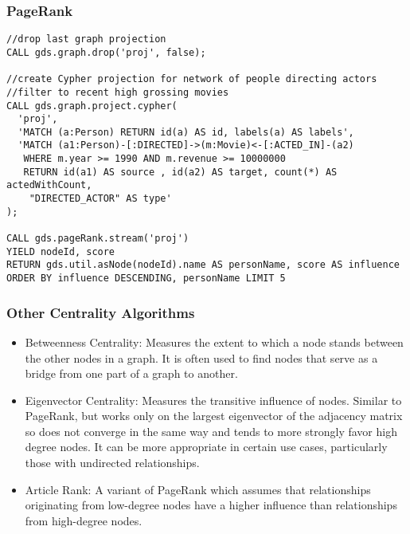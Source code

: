 \begin{frame}[fragile]\frametitle{PageRank}


\begin{lstlisting}
//drop last graph projection
CALL gds.graph.drop('proj', false);

//create Cypher projection for network of people directing actors
//filter to recent high grossing movies
CALL gds.graph.project.cypher(
  'proj',
  'MATCH (a:Person) RETURN id(a) AS id, labels(a) AS labels',
  'MATCH (a1:Person)-[:DIRECTED]->(m:Movie)<-[:ACTED_IN]-(a2)
   WHERE m.year >= 1990 AND m.revenue >= 10000000
   RETURN id(a1) AS source , id(a2) AS target, count(*) AS actedWithCount,
    "DIRECTED_ACTOR" AS type'
);

CALL gds.pageRank.stream('proj')
YIELD nodeId, score
RETURN gds.util.asNode(nodeId).name AS personName, score AS influence
ORDER BY influence DESCENDING, personName LIMIT 5

\end{lstlisting}

\end{frame}

\begin{frame}[fragile]\frametitle{Other Centrality Algorithms}

 
\begin{itemize}
\item Betweenness Centrality: Measures the extent to which a node stands between the other nodes in a graph. It is often used to find nodes that serve as a bridge from one part of a graph to another.
\item Eigenvector Centrality: Measures the transitive influence of nodes. Similar to PageRank, but works only on the largest eigenvector of the adjacency matrix so does not converge in the same way and tends to more strongly favor high degree nodes. It can be more appropriate in certain use cases, particularly those with undirected relationships.
\item Article Rank: A variant of PageRank which assumes that relationships originating from low-degree nodes have a higher influence than relationships from high-degree nodes.
\end{itemize}


\end{frame}



